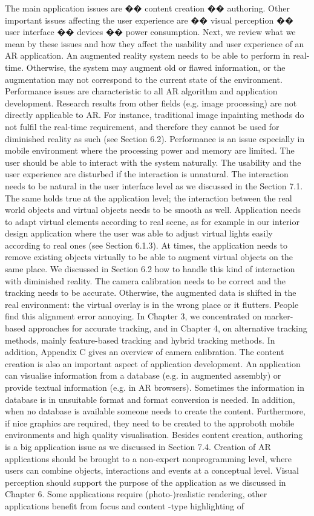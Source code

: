 The main application issues are �� content creation �� authoring. Other important issues affecting the user experience are �� visual perception �� user interface �� devices �� power consumption. Next, we review what we mean by these issues and how they affect the usability and user experience of an AR application. An augmented reality system needs to be able to perform in real-time. Otherwise, the system may augment old or flawed information, or the augmentation may not correspond to the current state of the environment. Performance issues are characteristic to all AR algorithm and application development. Research results from other fields (e.g. image processing) are not directly applicable to AR. For instance, traditional image inpainting methods do not fulfil the real-time requirement, and therefore they cannot be used for diminished reality as such (see Section 6.2). Performance is an issue especially in mobile environment where the processing power and memory are limited. The user should be able to interact with the system naturally. The usability and the user experience are disturbed if the interaction is unnatural. The interaction needs to be natural in the user interface level as we discussed in the Section 7.1. The same holds true at the application level; the interaction between the real world objects and virtual objects needs to be smooth as well. Application needs to adapt virtual elements according to real scene, as for example in our interior design application where the user was able to adjust virtual lights easily according to real ones (see Section 6.1.3). At times, the application needs to remove existing objects virtually to be able to augment virtual objects on the same place. We discussed in Section 6.2 how to handle this kind of interaction with diminished reality. The camera calibration needs to be correct and the tracking needs to be accurate. Otherwise, the augmented data is shifted in the real environment: the virtual overlay is in the wrong place or it flutters. People find this alignment error annoying. In Chapter 3, we concentrated on marker-based approaches for accurate tracking, and in Chapter 4, on alternative tracking methods, mainly feature-based tracking and hybrid tracking methods. In addition, Appendix C gives an overview of camera calibration. The content creation is also an important aspect of application development. An application can visualise information from a database (e.g. in augmented assembly) or provide textual information (e.g. in AR browsers). Sometimes the information in database is in unsuitable format and format conversion is needed. In addition, when no database is available someone needs to create the content. Furthermore, if nice graphics are required, they need to be created to the approboth mobile environments and high quality visualisation. Besides content creation, authoring is a big application issue as we discussed in Section 7.4. Creation of AR applications should be brought to a non-expert nonprogramming level, where users can combine objects, interactions and events at a conceptual level. Visual perception should support the purpose of the application as we discussed in Chapter 6. Some applications require (photo-)realistic rendering, other applications benefit from focus and content -type highlighting of 